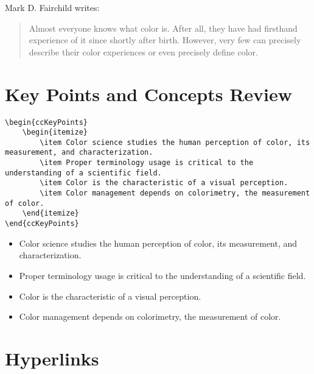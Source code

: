 Mark D. Fairchild writes:~\blockcquote[85]{Fairchild2013u}{Almost everyone knows what color is.
After all, they have had firsthand experience of it since shortly after birth.
However, very few can precisely describe their color experiences or even precisely define color.}

\section*{Key Points and Concepts Review}%
\label{sec:key-points-and-concepts-review}

\begin{lstlisting}[caption={Key points and concepts review.}]
\begin{ccKeyPoints}
    \begin{itemize}
        \item Color science studies the human perception of color, its measurement, and characterization.
        \item Proper terminology usage is critical to the understanding of a scientific field.
        \item Color is the characteristic of a visual perception.
        \item Color management depends on colorimetry, the measurement of color.
    \end{itemize}
\end{ccKeyPoints}
\end{lstlisting}

\begin{ccKeyPoints}
    \begin{itemize}
        \item Color science studies the human perception of color, its measurement, and characterization.
        \item Proper terminology usage is critical to the understanding of a scientific field.
        \item Color is the characteristic of a visual perception.
        \item Color management depends on colorimetry, the measurement of color.
    \end{itemize}
\end{ccKeyPoints}

\section*{Hyperlinks}%
\label{sec:hyperlinks}

